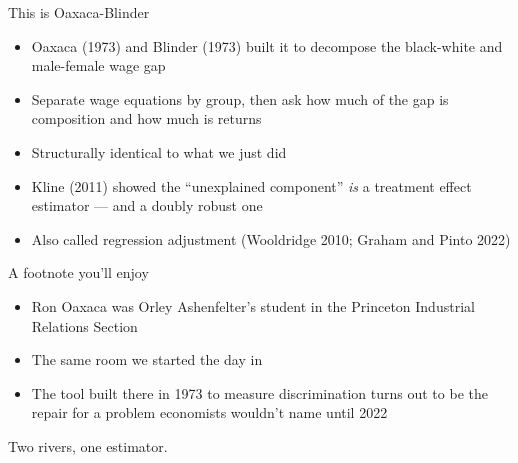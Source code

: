 \documentclass{beamer}
\newcommand{\deemph}[1]{\textcolor{warmgray}{\small #1}}
\begin{document}
\begin{frame}{This is Oaxaca-Blinder}

\begin{itemize}
\item Oaxaca (1973) and Blinder (1973) built it to decompose the black-white and
      male-female wage gap
\item Separate wage equations by group, then ask how much of the gap is
      composition and how much is returns
\item Structurally identical to what we just did
\item Kline (2011) showed the ``unexplained component'' \emph{is} a treatment effect
      estimator --- and a doubly robust one
\item Also called regression adjustment (Wooldridge 2010; Graham and Pinto 2022)
\end{itemize}

\end{frame}


\begin{frame}{A footnote you'll enjoy}

\begin{itemize}
\item Ron Oaxaca was Orley Ashenfelter's student in the Princeton Industrial Relations Section
\item The same room we started the day in
\item The tool built there in 1973 to measure discrimination turns out to be
      the repair for a problem economists wouldn't name until 2022
\end{itemize}

\vspace{0.6em}

\deemph{Two rivers, one estimator.}

\end{frame}
\end{document}
